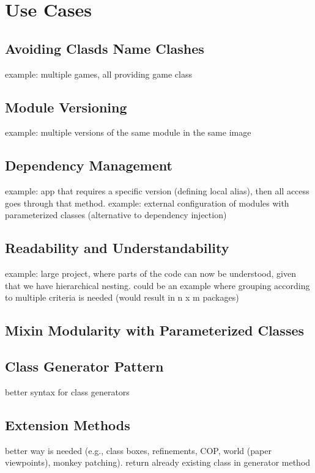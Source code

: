 \chapter{Use Cases}

\section{Avoiding Clasds Name Clashes}
example: multiple games, all providing game class

\section{Module Versioning}
example: multiple versions of the same module in the same image

\section{Dependency Management}
example: app that requires a specific version (defining local alias), then all access goes through that method. example: external configuration of modules with parameterized classes (alternative to dependency injection)

\section{Readability and Understandability}
example: large project, where parts of the code can now be understood, given that we have hierarchical nesting. could be an example where grouping according to multiple criteria is needed (would result in n x m packages)

\section{Mixin Modularity with Parameterized Classes}

\section{Class Generator Pattern}
\label{sec:usecase_classgen}
better syntax for class generators

\section{Extension Methods}
better way is needed (e.g., class boxes, refinements, COP, world (paper viewpoints), monkey patching). return already existing class in generator method
